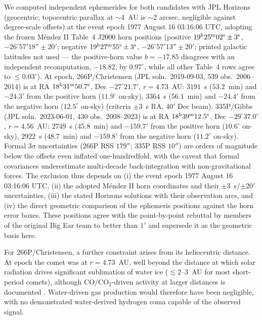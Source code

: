 \documentclass[twocolumn]{aastex701}
\begin{document}
We computed independent ephemerides for both candidates with JPL Horizons (geocentric; topocentric parallax at $\sim$4~AU is $\sim$2 arcsec, negligible against degree-scale offsets) at the event epoch 1977 August 16 03:16:06 UTC, adopting the frozen M\'endez II Table~4 J2000 horn positions (positive $19^{\rm h}25^{\rm m}02^{\rm s}\pm3^{\rm s}$, $-26^\circ57'18''\pm20'$; negative $19^{\rm h}27^{\rm m}55^{\rm s}\pm3^{\rm s}$, $-26^\circ57'13''\pm20'$; printed galactic latitudes not used --- the positive-horn value $b=-17.85$ disagrees with an independent recomputation, $-18.82$, by $0.97^\circ$, while all other Table~4 rows agree to $\leq0.03^\circ$). At epoch, 266P/Christensen (JPL soln.\ 2019-09-03, 539 obs.\ 2006--2014) is at RA $18^{\rm h}31^{\rm m}50.7^{\rm s}$, Dec $-27^\circ21.7'$, $r=4.73$~AU: $3191$~s ($53.2$~min) and $-24.3'$ from the positive horn ($11.9^\circ$ on-sky), $3364$~s ($56.1$~min) and $-24.4'$ from the negative horn ($12.5^\circ$ on-sky) (criteria $\pm3$~s RA, $40'$ Dec beam). 335P/Gibbs (JPL soln.\ 2023-06-01, 430 obs.\ 2008--2023) is at RA $18^{\rm h}39^{\rm m}12.5^{\rm s}$, Dec $-29^\circ37.0'$, $r=4.56$~AU: $2749$~s ($45.8$~min) and $-159.7'$ from the positive horn ($10.6^\circ$ on-sky), $2922$~s ($48.7$~min) and $-159.8'$ from the negative horn ($11.2^\circ$ on-sky). Formal $3\sigma$ uncertainties (266P RSS $179''$; 335P RSS $10''$) are orders of magnitude below the offsets even inflated one-hundredfold, with the caveat that formal covariances underestimate multi-decade back-integration with non-gravitational forces. The exclusion thus depends on (i) the event epoch 1977 August 16 03:16:06 UTC, (ii) the adopted M\'endez II horn coordinates and their $\pm3$~s/$\pm20'$ uncertainties, (iii) the stated Horizons solutions with their observation arcs, and (iv) the direct geometric comparison of the ephemeris positions against the horn error boxes. These positions agree with the point-by-point rebuttal by members of the original Big Ear team \citep{naapo2017} to better than $1'$ and supersede it as the geometric basis here.

For 266P/Christensen, a further constraint arises from its heliocentric distance. At epoch the comet was at $r=4.73$~AU, well beyond the distance at which solar radiation drives significant sublimation of water ice ($\lesssim$2--3~AU for most short-period comets), although CO/CO$_2$-driven activity at larger distances is documented \citep{gicquel2023}. Water-driven gas production would therefore have been negligible, with no demonstrated water-derived hydrogen coma capable of the observed signal.
\end{document}
